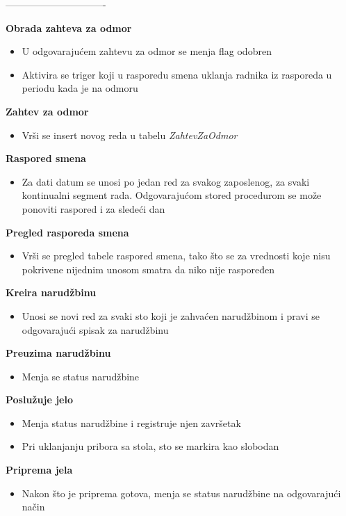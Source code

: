 \documentclass{article}
\begin{document}
-------------------------------

\textbf{Obrada zahteva za odmor}
\begin{itemize}
\item U odgovarajućem zahtevu za odmor se menja flag odobren
\item Aktivira se triger koji u rasporedu smena uklanja radnika iz rasporeda u periodu kada je na odmoru
\end{itemize}

\textbf{Zahtev za odmor}
\begin{itemize}
\item Vrši se insert novog reda u tabelu \emph{ZahtevZaOdmor} 
\end{itemize}

\textbf{Raspored smena}
\begin{itemize}
\item Za dati datum se unosi po jedan red za svakog zaposlenog, za svaki kontinualni segment rada. Odgovarajućom stored procedurom se može ponoviti raspored i za sledeći dan
\end{itemize}

\textbf{Pregled rasporeda smena}
\begin{itemize}
\item Vrši se pregled tabele raspored smena, tako što se za vrednosti koje nisu pokrivene nijednim unosom smatra da niko nije raspoređen
\end{itemize}


\textbf{Kreira narudžbinu}
\begin{itemize}
\item Unosi se novi red za svaki sto koji je zahvaćen narudžbinom i pravi se odgovarajući spisak za narudžbinu
\end{itemize}


\textbf{Preuzima narudžbinu}
\begin{itemize}
\item Menja se status narudžbine 
\end{itemize}

\textbf{Poslužuje jelo}
\begin{itemize}
\item Menja status narudžbine i registruje njen završetak
\item Pri uklanjanju pribora sa stola, sto se markira kao slobodan
\end{itemize}


\textbf{Priprema jela}
\begin{itemize}
\item Nakon što je priprema gotova, menja se status narudžbine na odgovarajući način
\end{itemize}
\end{document}
